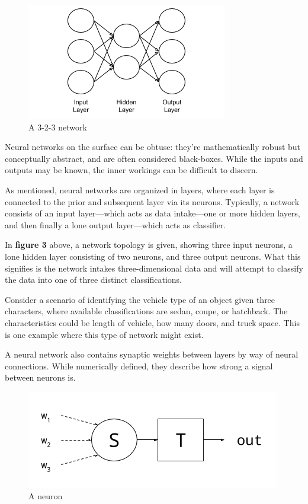 \documentclass[a4paper,12pt]{article}
\begin{document}
\begin{figure}[h!]
\centering
\includegraphics[scale=0.65]{images/network-diagram.png}
\caption{A 3-2-3 network}
\label{fig:network_diagram}
\end{figure}

Neural networks on the surface can be obtuse: they're mathematically robust but conceptually abstract, and are often considered black-boxes. While the inputs and outputs may be known, the inner workings can be difficult to discern.

\pagebreak

As mentioned, neural networks are organized in layers, where each layer is connected to the prior and subsequent layer via its neurons. Typically, a network consists of an input layer---which acts as data intake---one or more hidden layers, and then finally a lone output layer---which acts as classifier.

In \textbf{figure 3} above, a network topology is given, showing three input neurons, a lone hidden layer consisting of two neurons, and three output neurons. What this signifies is the network intakes three-dimensional data and will attempt to classify the data into one of three distinct classifications.

Consider a scenario of identifying the vehicle type of an object given three characters, where available classifications are sedan, coupe, or hatchback. The characteristics could be length of vehicle, how many doors, and truck space. This is one example where this type of network might exist.

A neural network also contains synaptic weights between layers by way of neural connections. While numerically defined, they describe how strong a signal between neurons is.

\begin{figure}[h!]
\centering
\includegraphics[scale=0.7]{images/neuron-diagram.png}
\caption{A neuron}
\label{fig:neuron_diagram}
\end{figure}
\end{document}
